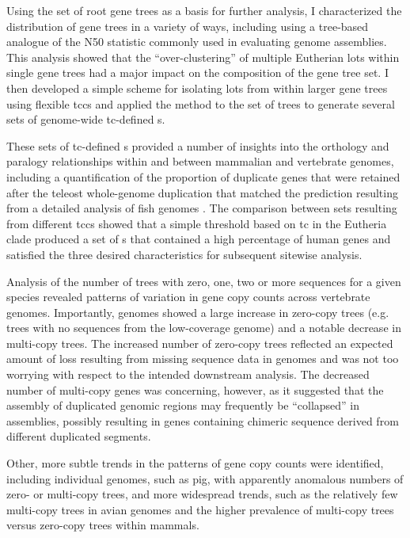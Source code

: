 Using the set of root \cmp gene trees as a basis for further analysis,
I characterized the distribution of gene trees in a variety of ways,
including using a tree-based analogue of the N50 statistic commonly
used in evaluating genome assemblies. This analysis showed that the
``over-clustering'' of multiple Eutherian \acp{lot} within single \cmp
gene trees had a major impact on the composition of the gene tree
set. I then developed a simple scheme for isolating \acp{lot} from
within larger gene trees using flexible \acfp{tcc} and applied the
method to the set of \cmp trees to generate several sets of
genome-wide \ac{tc}-defined \subtr{}s.

These sets of \ac{tc}-defined \subtr{}s provided a number of insights
into the orthology and paralogy relationships within and between
mammalian and vertebrate genomes, including a quantification of the
proportion of duplicate genes that were retained after the teleost
whole-genome duplication that matched the prediction resulting from a
detailed analysis of fish genomes \citep{Brunet2006}. The comparison
between \subtr{} sets resulting from different \acp{tcc} showed that a
simple threshold based on \ac{tc} in the Eutheria clade produced a set
of \subtr{}s that contained a high percentage of human genes and
satisfied the three desired characteristics for subsequent sitewise
analysis.

Analysis of the number of trees with zero, one, two or more sequences
for a given species revealed patterns of variation in gene copy counts
across vertebrate genomes. Importantly, \lcv genomes showed a large
increase in zero-copy trees (e.g. trees with no sequences from the
low-coverage genome) and a notable decrease in multi-copy trees. The
increased number of zero-copy trees reflected an expected amount of
loss resulting from missing sequence data in \lcv genomes and was not
too worrying with respect to the intended downstream analysis. The
decreased number of multi-copy genes was concerning, however, as it
suggested that the assembly of duplicated genomic regions may
frequently be ``collapsed'' in \lcv assemblies, possibly resulting in
genes containing chimeric sequence derived from different duplicated
segments.

Other, more subtle trends in the patterns of gene copy counts were
identified, including individual genomes, such as pig, with apparently
anomalous numbers of zero- or multi-copy trees, and more widespread
trends, such as the relatively few multi-copy trees in avian genomes
and the higher prevalence of multi-copy trees versus zero-copy trees
within mammals.

